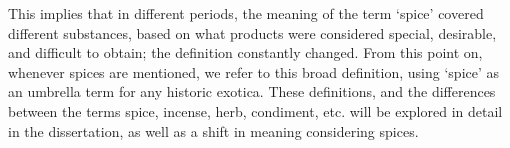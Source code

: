 This implies that in different periods, the meaning of the term ‘spice’ covered different substances, based on what products were considered special, desirable, and difficult to obtain; the definition constantly changed. From this point on, whenever spices are mentioned, we refer to this broad definition, using ‘spice’ as an umbrella term for any historic exotica. These definitions, and the differences between the terms spice, incense, herb, condiment, etc. will be explored in detail in the dissertation, as well as a shift in meaning considering spices.


